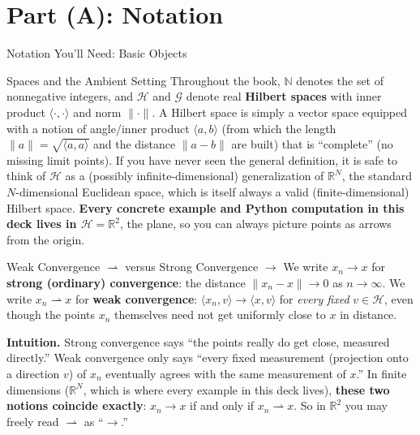 \documentclass[aspectratio=169,10pt]{beamer}
\newcommand{\R}{\mathbb{R}}
\newcommand{\wto}{\rightharpoonup}
\begin{document}
\section{Part (A): Notation}

\begin{frame}[allowframebreaks]{Notation You'll Need: Basic Objects}

  \begin{block}{Spaces and the Ambient Setting}
    Throughout the book, $\mathbb{N}$ denotes the set of nonnegative
    integers, and $\mathcal{H}$ and $\mathcal{G}$ denote real
    \textbf{Hilbert spaces} with inner product $\langle \cdot, \cdot \rangle$
    and norm $\|\cdot\|$. A Hilbert space is simply a vector space equipped
    with a notion of angle/inner product $\langle a, b\rangle$ (from which the
    length $\|a\| = \sqrt{\langle a, a\rangle}$ and the distance
    $\|a-b\|$ are built) that is ``complete'' (no missing limit points). If
    you have never seen the general definition, it is safe to think of
    $\mathcal{H}$ as a (possibly infinite-dimensional) generalization of
    $\R^N$, the standard $N$-dimensional Euclidean space, which is itself
    always a valid (finite-dimensional) Hilbert space. \textbf{Every concrete
    example and Python computation in this deck lives in $\mathcal{H} = \R^2$},
    the plane, so you can always picture points as arrows from the origin.
  \end{block}

  \begin{block}{Weak Convergence $\wto$ versus Strong Convergence $\to$}
    We write $x_n \to x$ for \textbf{strong (ordinary) convergence}: the
    distance $\|x_n - x\| \to 0$ as $n \to \infty$. We write $x_n \wto x$ for
    \textbf{weak convergence}: $\langle x_n, v \rangle \to \langle x, v
    \rangle$ for \emph{every fixed} $v \in \mathcal{H}$, even though the
    points $x_n$ themselves need not get uniformly close to $x$ in distance.

    \medskip
    \textbf{Intuition.} Strong convergence says ``the points really do get
    close, measured directly.'' Weak convergence only says ``every fixed
    measurement (projection onto a direction $v$) of $x_n$ eventually agrees
    with the same measurement of $x$.'' In finite dimensions ($\R^N$, which is
    where every example in this deck lives), \textbf{these two notions
    coincide exactly}: $x_n \to x$ if and only if $x_n \wto x$. So in $\R^2$
    you may freely read $\wto$ as ``$\to$.''
  \end{block}


\end{frame}
\end{document}
